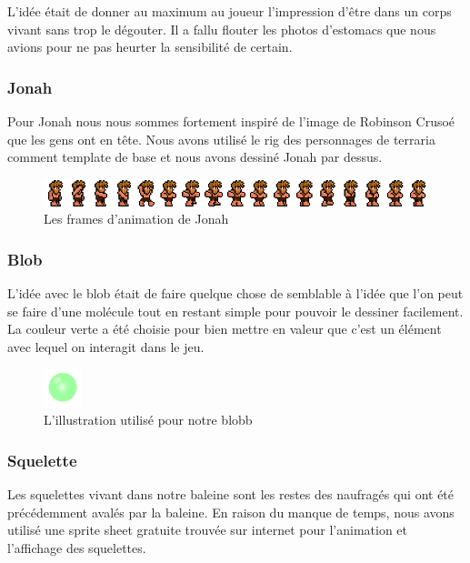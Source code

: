 \documentclass{prologArticle}
\begin{document}
L'idée était de donner au maximum au joueur l'impression d'être dans un corps vivant sans trop le dégouter. Il a fallu flouter les photos d'estomacs que nous avions pour ne pas heurter la sensibilité de certain.

\subsubsection{Jonah}
Pour Jonah nous nous sommes fortement inspiré de l'image de Robinson Crusoé que les gens ont en tête. Nous avons utilisé le rig des personnages de terraria comment template de base et nous avons dessiné Jonah par dessus.

\begin{figure}[H]
    \centering
    \includegraphics[width=\textwidth]{res/jona_sheet.png}
    \caption{Les frames d'animation de Jonah}
\end{figure}

\subsubsection{Blob}
L'idée avec le blob était de faire quelque chose de semblable à l'idée que l'on peut se faire d'une molécule tout en restant simple pour pouvoir le dessiner facilement. La couleur verte a été choisie pour bien mettre en valeur que c'est un élément avec lequel on interagit dans le jeu.

\begin{figure}[H]
    \centering
    \includegraphics[width=0.1\textwidth]{res/blobb.png}
    \caption{L'illustration utilisé pour notre blobb}
\end{figure}

\subsubsection{Squelette}
Les squelettes vivant dans notre baleine sont les restes des naufragés qui ont été précédemment avalés par la baleine. En raison du manque de temps, nous avons utilisé une sprite sheet gratuite trouvée sur internet pour l'animation et l'affichage des squelettes.
\end{document}
